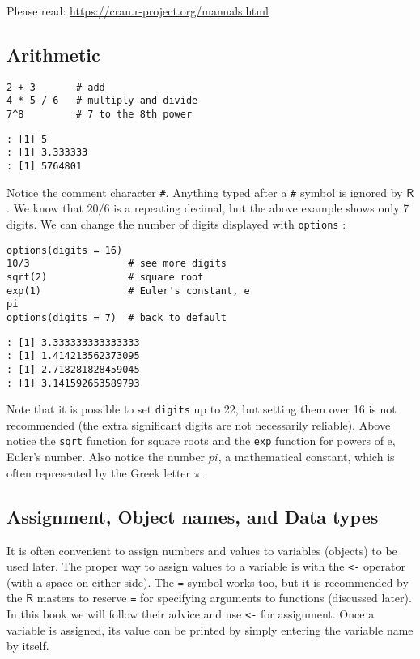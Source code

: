 Please read: \url{https://cran.r-project.org/manuals.html}

\subsection{Arithmetic}
\label{sec-2-3-1}

\begin{Verbatim}
2 + 3       # add
4 * 5 / 6   # multiply and divide
7^8         # 7 to the 8th power
\end{Verbatim}

\begin{verbatim}
: [1] 5
: [1] 3.333333
: [1] 5764801
\end{verbatim}

Notice the comment character \texttt{\#}. Anything typed
after a \texttt{\#} symbol is ignored by \(\mathsf{R}\). We know that \(20/6\)
is a repeating decimal, but the above example shows only 7 digits. We
can change the number of digits displayed with
\texttt{options} :

\begin{Verbatim}
options(digits = 16)
10/3                 # see more digits
sqrt(2)              # square root
exp(1)               # Euler's constant, e
pi       
options(digits = 7)  # back to default
\end{Verbatim}

\begin{verbatim}
: [1] 3.333333333333333
: [1] 1.414213562373095
: [1] 2.718281828459045
: [1] 3.141592653589793
\end{verbatim}

Note that it is possible to set \texttt{digits}
 up to 22, but setting them
over 16 is not recommended (the extra significant digits are not
necessarily reliable). Above notice the \texttt{sqrt}
 function for square roots and the
\texttt{exp}  function for powers of
\(\mathrm{e}\), Euler's number.
Also notice the number $pi$, a mathematical constant, which is often represented by the Greek letter $\pi$.

\subsection{Assignment, Object names, and Data types}
\label{sec-2-3-2}

It is often convenient to assign numbers and values to variables
(objects) to be used later. The proper way to assign values to a
variable is with the \texttt{<-} operator (with a space on either side). The
\verb~=~ symbol works too, but it is recommended by the \(\mathsf{R}\)
masters to reserve \verb~=~ for specifying arguments to functions
(discussed later). In this book we will follow their advice and use
\texttt{<-} for assignment. Once a variable is assigned, its value can be
printed by simply entering the variable name by itself.

